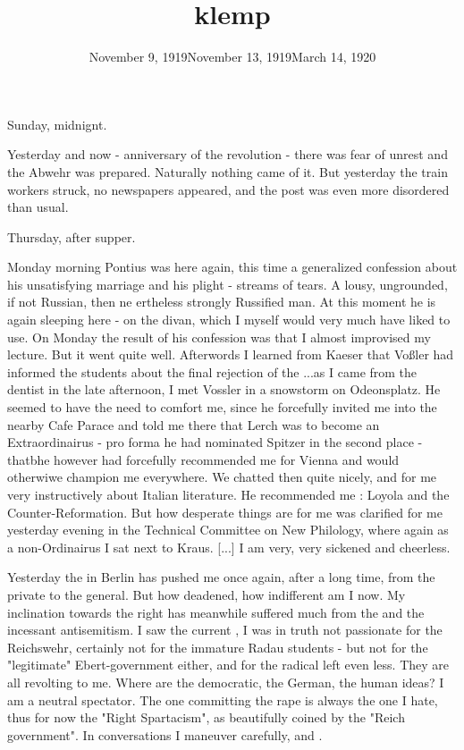 \documentclass{article}
\title{klemp}
\begin{document}
\date{November 9, 1919}
Sunday, midnignt.

Yesterday and now - anniversary of the revolution - there was fear of unrest and the Abwehr was prepared. Naturally nothing came of it. But yesterday the train workers struck, no newspapers appeared, and the post was even more disordered than usual.

\date{November 13, 1919}
Thursday, after supper.

Monday morning Pontius was here again, this time a generalized confession about his unsatisfying marriage and his plight - streams of tears. A lousy, ungrounded, if not Russian, then ne ertheless strongly Russified man. At this moment he is again sleeping here - on the divan, which I myself would very much have liked to use. On Monday the result of his confession was that I almost improvised my lecture. But it went quite well. Afterwords I learned from Kaeser that Voßler had informed the students about the final rejection of the ...as I came from the dentist in the late afternoon, I met Vossler in a snowstorm on Odeonsplatz. He seemed to have the need to comfort me, since he forcefully invited me into the nearby Cafe Parace and told me there that Lerch was to become an Extraordinairus - pro forma he had nominated Spitzer in the second place - thatbhe however had forcefully recommended me for Vienna and would otherwiwe champion me everywhere. We chatted then quite nicely, and for me very instructively about Italian literature. He recommended me : Loyola and the Counter-Reformation. But how desperate things are for me was clarified for me yesterday evening in the Technical Committee on New Philology, where again as a non-Ordinairus I sat next to Kraus. [...] I am very, very sickened and cheerless.

\date{March 14, 1920}

Yesterday the \textit{} in Berlin has pushed me once again, after a long time, from the private to the general. But how deadened, how indifferent am I now. My inclination towards the right has meanwhile suffered much from the  and the incessant antisemitism. I saw the current  , I was in truth not passionate for the  Reichswehr, certainly not for the immature Radau students - but not for the "legitimate" Ebert-government either, and for the radical left even less. They are all revolting to me. Where are the democratic, the German, the human ideas? I am a neutral spectator. The one committing the rape is always the one I hate, thus for now the "Right Spartacism", as beautifully coined by the "Reich government". In conversations I maneuver carefully, and .
\end{document}
